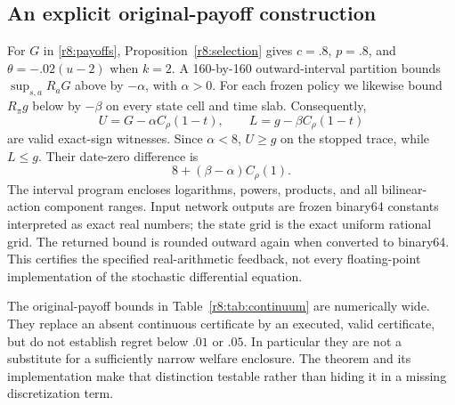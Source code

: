 \subsection{An explicit original-payoff construction}
For $G$ in \eqref{r8:payoffs}, Proposition~\ref{r8:selection} gives $c=.8$, $p=.8$, and $\theta=-.02(u-2)$ when $k=2$. A 160-by-160 outward-interval partition bounds $\sup_{s,a}R_aG$ above by $-\alpha$, with $\alpha>0$. For each frozen policy we likewise bound $R_\pi g$ below by $-\beta$ on every state cell and time slab. Consequently,
\begin{equation}
 U=G-\alpha C_\rho(1-t),\qquad L=g-\beta C_\rho(1-t)\label{r8:explicitpair}
\end{equation}
are valid exact-sign witnesses. Since $\alpha<8$, $U\geq g$ on the stopped trace, while $L\leq g$. Their date-zero difference is
\begin{equation}
 8+(\beta-\alpha)C_\rho(1).\label{r8:explicitgap}
\end{equation}
The interval program encloses logarithms, powers, products, and all bilinear-action component ranges. Input network outputs are frozen binary64 constants interpreted as exact real numbers; the state grid is the exact uniform rational grid. The returned bound is rounded outward again when converted to binary64. This certifies the specified real-arithmetic feedback, not every floating-point implementation of the stochastic differential equation.


The original-payoff bounds in Table~\ref{r8:tab:continuum} are numerically wide. They replace an absent continuous certificate by an executed, valid certificate, but do not establish regret below $.01$ or $.05$. In particular they are not a substitute for a sufficiently narrow welfare enclosure. The theorem and its implementation make that distinction testable rather than hiding it in a missing discretization term.

